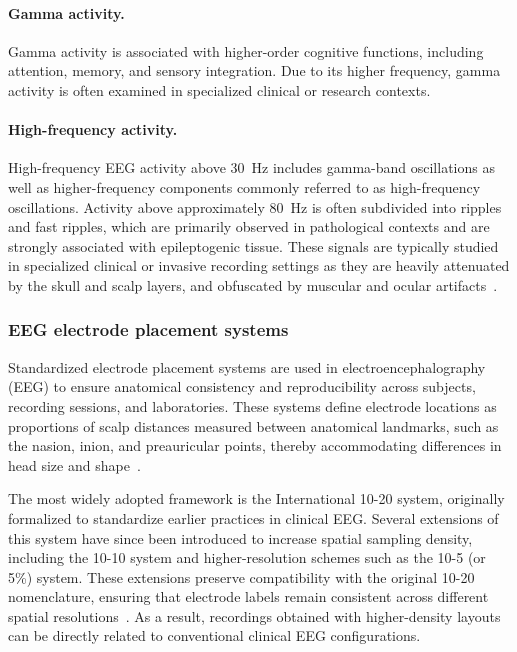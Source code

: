 \paragraph*{Gamma activity.}
Gamma activity is associated with higher-order cognitive functions, including attention, memory, and sensory integration. Due to its higher frequency, gamma activity is often examined in specialized clinical or research contexts.

\paragraph*{High-frequency activity.}
High-frequency EEG activity above 30~Hz includes gamma-band oscillations as well as higher-frequency components commonly referred to as high-frequency oscillations.
Activity above approximately 80~Hz is often subdivided into ripples and fast ripples, which are primarily observed in pathological contexts and are strongly associated
with epileptogenic tissue. These signals are typically studied in specialized clinical or invasive recording settings as they are heavily attenuated by the skull and scalp
layers, and obfuscated by muscular and ocular artifacts~\cite{FREEMAN20031053, nayak-2025}.

\subsubsection{EEG electrode placement systems}

Standardized electrode placement systems are used in electroencephalography (EEG) to ensure anatomical consistency and reproducibility across subjects,
recording sessions, and laboratories. These systems define electrode locations as proportions of scalp distances measured between anatomical landmarks,
such as the nasion, inion, and preauricular points, thereby accommodating differences in head size and shape~\cite{klem-1999}.

The most widely adopted framework is the International 10{-}20 system, originally formalized to standardize earlier practices in clinical EEG.
Several extensions of this system have since been introduced to increase spatial sampling density, including the 10{-}10 system and higher-resolution
schemes such as the 10{-}5 (or 5\%) system. These extensions preserve compatibility with the original 10{-}20 nomenclature, ensuring that electrode labels
remain consistent across different spatial resolutions~\cite{klem-1999}. As a result, recordings obtained with higher-density layouts can be directly related to
conventional clinical EEG configurations.

